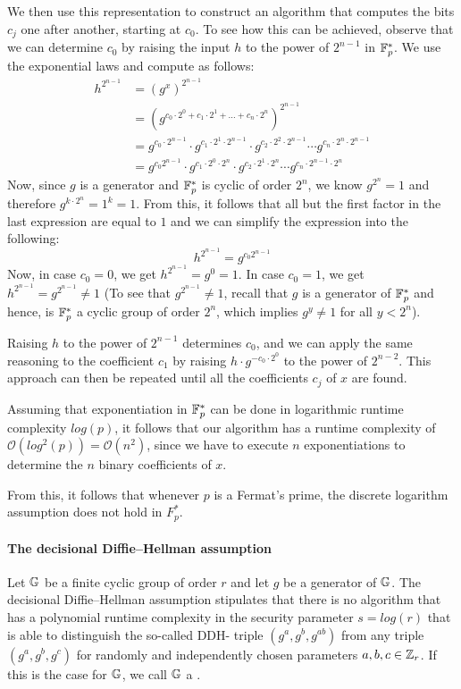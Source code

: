 \begin{example}
We then use this representation to construct an algorithm that computes the bits $c_j$ one after another, starting at $c_0$. To see how this can be achieved, observe that we can determine $c_0$ by raising the input $h$ to the power of $2^{n-1}$ in $\mathbb{F}_p^*$. We use the exponential laws and compute as follows:
\begin{align*}
h^{2^{n-1}} & = \left(g^x\right)^{2^{n-1}}\\
            & = \left(g^{c_0\cdot 2^0 + c_1\cdot 2^1 + \ldots + c_n\cdot 2^n}\right)^{2^{n-1}}\\
            & = g^{c_0\cdot 2^{n-1}}\cdot g^{c_1\cdot 2^1\cdot 2^{n-1}} \cdot
            g^{c_2\cdot 2^2\cdot 2^{n-1}} \cdots g^{c_n\cdot 2^n\cdot 2^{n-1}}\\
            & = g^{c_0 2^{n-1}}\cdot g^{c_1\cdot 2^0\cdot 2^{n}} \cdot
            g^{c_2\cdot 2^1\cdot 2^{n}} \cdots g^{c_n\cdot 2^{n-1}\cdot 2^{n}}
\end{align*}
Now, since $g$ is a generator and $\mathbb{F}_p^*$ is cyclic of order $2^n$, we know $g^{2^n}=1$ and therefore $g^{k\cdot 2^n}= 1^k=1$. From this, it follows that all but the first factor in the last expression are equal to $1$ and we can simplify the expression into the following:
\begin{equation}
h^{2^{n-1}} = g^{c_0 2^{n-1}}
\end{equation}
Now, in case $c_0=0$, we get $h^{2^{n-1}} = g^0=1$. In case $c_0=1$, we get
$h^{2^{n-1}} = g^{2^{n-1}}\neq 1$ (To see that $g^{2^{n-1}}\neq 1$, recall that $g$ is a generator of $\mathbb{F}_p^*$ and hence, is $\mathbb{F}_p^*$  a cyclic group of order $2^n$, which implies $g^y\neq 1$ for all $y<2^n$).

Raising $h$ to the power of $2^{n-1}$ determines $c_0$, and we can apply the same reasoning to the coefficient $c_1$ by raising $h\cdot g^{-c_0\cdot 2^0}$ to the power of $2^{n-2}$. This approach can then be repeated until all the coefficients $c_j$ of $x$ are found.

Assuming that exponentiation in $\mathbb{F}_p^*$ can be done in logarithmic runtime complexity $log(p)$, it follows that our algorithm has a runtime complexity of
$\mathcal{O}(log^2(p))=\mathcal{O}(n^2)$, since we have to execute $n$ exponentiations to determine the $n$ binary coefficients of $x$.

From this, it follows that whenever $p$ is a Fermat's prime, the discrete logarithm assumption does not hold in $F_p^*$.
\end{example}
\paragraph{The decisional Diffie--Hellman assumption}
Let $\mathbb{G}$ be a finite cyclic group of order $r$ and let $g$ be a generator of $\mathbb{G}$. The decisional Diffie--Hellman assumption stipulates that there is no algorithm that has a polynomial runtime complexity in the security parameter $s= log(r)$ that is able to distinguish the so-called DDH- triple $(g^a,g^b, g^{ab})$ from any triple $(g^a,g^b,g^c)$ for randomly and independently  chosen parameters $a,b,c\in \mathbb{Z}_r$. If this is the case for $\mathbb{G}$, we call $\mathbb{G}$ a .

